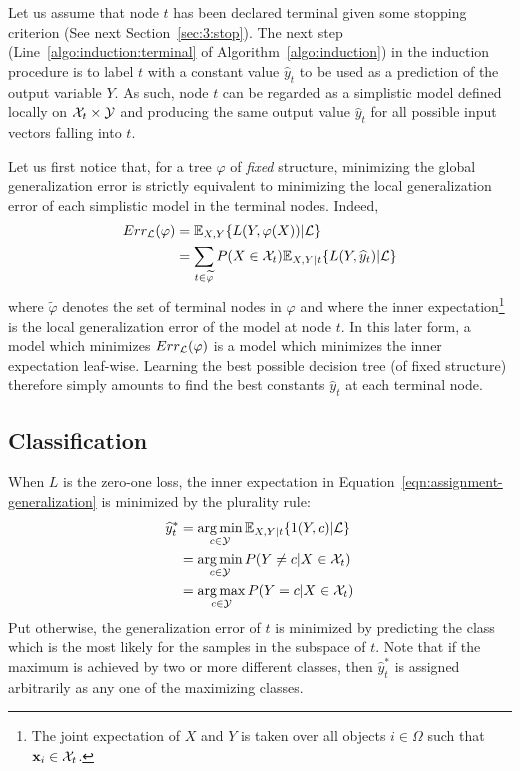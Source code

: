 Let us assume that node $t$ has been declared terminal given some stopping
criterion (See next Section~\ref{sec:3:stop}). The next step
(Line~\ref{algo:induction:terminal} of Algorithm~\ref{algo:induction}) in the
induction procedure is to label $t$ with a constant value $\widehat{y}_t$ to
be used as a prediction of the output variable $Y$. As such, node $t$ can  be
regarded as a simplistic model defined locally on ${\cal X}_t \times {\cal Y}$
and producing the same output value $\widehat{y}_t$ for all possible input
vectors falling into $t$.

Let us first notice that, for a tree $\varphi$ of \textit{fixed} structure,
minimizing the global generalization error is strictly equivalent to minimizing
the local generalization error of each simplistic model in the terminal nodes.
Indeed,
\begin{align}
Err_{\cal L}(\varphi) &= \mathbb{E}_{X,Y} \{ L(Y, \varphi(X)) | {\cal L} \} \nonumber \\
                      &= \sum_{t \in \widetilde{\varphi}} P(X \in {\cal X}_t) \mathbb{E}_{X,Y|t} \{ L(Y, \widehat{y}_t) | {\cal L} \} \label{eqn:assignment-generalization}
\end{align}
where $\widetilde{\varphi}$ denotes the set of terminal nodes in $\varphi$
and where the inner expectation\footnote{The joint expectation of $X$ and $Y$
is taken over all objects $i \in \Omega$ such that $\mathbf{x}_i \in {\cal X}_t$.}
is the local generalization error of the model at node $t$. In this later form,
a model which minimizes $Err_{\cal L}(\varphi)$ is a model which minimizes the inner
expectation leaf-wise. Learning the best possible decision tree (of
fixed structure) therefore simply amounts to find the best constants
$\widehat{y}_t$ at each terminal node.

\subsection{Classification}

When $L$ is the zero-one loss, the inner expectation in Equation~\ref{eqn:assignment-generalization}
is minimized by the plurality rule:
\begin{align}
\widehat{y}_t^* &= \operatorname*{arg\,min}_{c \in {\cal Y}} \mathbb{E}_{X, Y|t}\{ 1(Y, c) | {\cal L} \} \nonumber \\
                &= \operatorname*{arg\,min}_{c \in {\cal Y}} P(Y \neq c | X \in {\cal X}_t) \nonumber \\
                &= \operatorname*{arg\,max}_{c \in {\cal Y}} P(Y = c | X \in {\cal X}_t)\label{eqn:assignment-classification}
\end{align}
Put otherwise, the generalization error of $t$ is minimized by predicting
the class which is the most likely for the samples in the subspace of $t$.
Note that if the maximum is achieved by two or more different classes, then
$\widehat{y}_t^*$ is assigned arbitrarily as any one of the maximizing classes.

